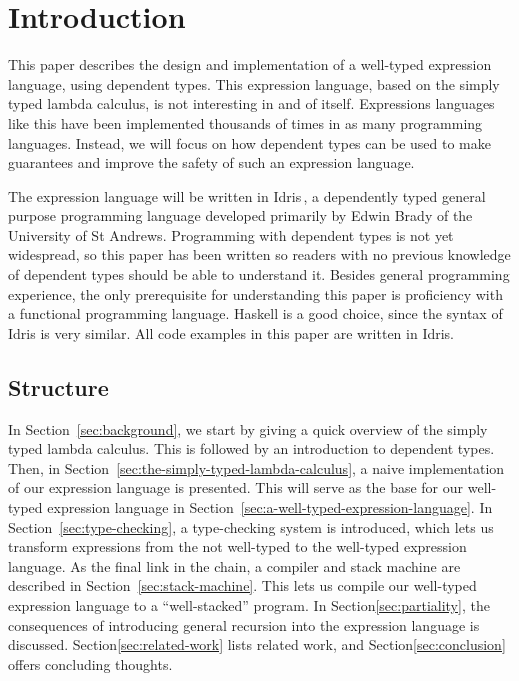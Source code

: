 \section{Introduction}
\label{sec:introduction}

This paper describes the design and implementation of a well-typed expression language, using dependent types. This expression language, based on the simply typed lambda calculus, is not interesting in and of itself. Expressions languages like this have been implemented thousands of times in as many programming languages. Instead, we will focus on how dependent types can be used to make guarantees and improve the safety of such an expression language.

The expression language will be written in Idris\,\cite{Idris}, a dependently typed general purpose programming language developed primarily by Edwin Brady of the University of St Andrews. Programming with dependent types is not yet widespread, so this paper has been written so readers with no previous knowledge of dependent types should be able to understand it. Besides general programming experience, the only prerequisite for understanding this paper is proficiency with a functional programming language. Haskell is a good choice, since the syntax of Idris is very similar. All code examples in this paper are written in Idris.

\subsection{Structure}
In Section~\ref{sec:background}, we start by giving a quick overview of the simply typed lambda calculus. This is followed by an introduction to dependent types. Then, in Section~\ref{sec:the-simply-typed-lambda-calculus}, a naive implementation of our expression language is presented. This will serve as the base for our well-typed expression language in Section~\ref{sec:a-well-typed-expression-language}. In Section~\ref{sec:type-checking}, a type-checking system is introduced, which lets us transform expressions from the not well-typed to the well-typed expression language. As the final link in the chain, a compiler and stack machine are described in Section~\ref{sec:stack-machine}. This lets us compile our well-typed expression language to a ``well-stacked'' program. In Section\~\ref{sec:partiality}, the consequences of introducing general recursion into the expression language is discussed. Section\~\ref{sec:related-work} lists related work, and Section\~\ref{sec:conclusion} offers concluding thoughts.